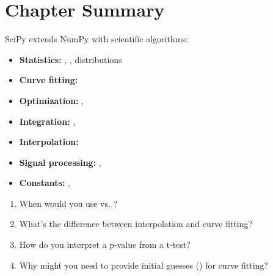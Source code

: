 \section{Chapter Summary}
\label{sec:scipy-summary}

SciPy extends NumPy with scientific algorithms:

\begin{itemize}
    \item \textbf{Statistics:} , , distributions
    \item \textbf{Curve fitting:} 
    \item \textbf{Optimization:} , 
    \item \textbf{Integration:} , 
    \item \textbf{Interpolation:} 
    \item \textbf{Signal processing:} , 
    \item \textbf{Constants:} , 
\end{itemize}

\begin{ponder}
\begin{enumerate}
    \item When would you use  vs. ?
    \item What's the difference between interpolation and curve fitting?
    \item How do you interpret a p-value from a t-test?
    \item Why might you need to provide initial guesses () for curve fitting?
\end{enumerate}
\end{ponder}
